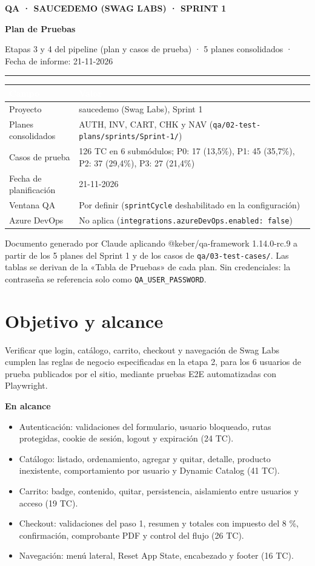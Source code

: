 \documentclass[10pt,a4paper]{article}
\newcommand{\tabhead}{\rowcolor{primary}}
\newcommand{\hcell}[1]{\textcolor{white}{\bfseries #1}}
\newcommand{\zebrarows}{\rowcolors{2}{zebra}{white}}
\newcommand{\reportcover}[3]{%
  \thispagestyle{first}%
  {\color{primary}\small\bfseries #1}\par\vspace{4pt}
  {\raggedright\fontsize{22}{28}\selectfont\bfseries\color{ink} #2\par}\vspace{6pt}
  {\small\color{muted} #3}\par\vspace{6pt}
  {\color{primary}\rule{\textwidth}{1pt}}\par
}
\begin{document}
\small

\reportcover
  {QA · SAUCEDEMO (SWAG LABS) · SPRINT 1}
  {Plan de Pruebas}
  {Etapas 3 y 4 del pipeline (plan y casos de prueba) · 5 planes consolidados · Fecha de informe: 21-11-2026}

{\zebrarows
\begin{tabularx}{\textwidth}{|L{0.24\textwidth}|Y|}
\hline
\tabhead \hcell{Campo} & \hcell{Valor} \\ \hline
Proyecto & saucedemo (Swag Labs), Sprint 1 \\ \hline
Planes consolidados & AUTH, INV, CART, CHK y NAV (\texttt{qa/02-test-plans/sprints/Sprint-1/}) \\ \hline
Casos de prueba & 126 TC en 6 submódulos; P0: 17 (13,5\%), P1: 45 (35,7\%), P2: 37 (29,4\%), P3: 27 (21,4\%) \\ \hline
Fecha de planificación & 21-11-2026 \\ \hline
Ventana QA & Por definir (\texttt{sprintCycle} deshabilitado en la configuración) \\ \hline
Azure DevOps & No aplica (\texttt{integrations.azureDevOps.enabled: false}) \\ \hline
\end{tabularx}}

\begin{infonote}
Documento generado por Claude aplicando @keber/qa-framework 1.14.0-rc.9 a partir de los 5 planes del Sprint 1 y de los casos de \texttt{qa/03-test-cases/}. Las tablas se derivan de la «Tabla de Pruebas» de cada plan. Sin credenciales: la contraseña se referencia solo como \texttt{QA\_USER\_PASSWORD}.
\end{infonote}

\section{Objetivo y alcance}
Verificar que login, catálogo, carrito, checkout y navegación de Swag Labs cumplen las reglas de negocio especificadas en la etapa 2, para los 6 usuarios de prueba publicados por el sitio, mediante pruebas E2E automatizadas con Playwright.

\textbf{En alcance}
\begin{itemize}
  \item Autenticación: validaciones del formulario, usuario bloqueado, rutas protegidas, cookie de sesión, logout y expiración (24 TC).
  \item Catálogo: listado, ordenamiento, agregar y quitar, detalle, producto inexistente, comportamiento por usuario y Dynamic Catalog (41 TC).
  \item Carrito: badge, contenido, quitar, persistencia, aislamiento entre usuarios y acceso (19 TC).
  \item Checkout: validaciones del paso 1, resumen y totales con impuesto del 8 \%, confirmación, comprobante PDF y control del flujo (26 TC).
  \item Navegación: menú lateral, Reset App State, encabezado y footer (16 TC).
\end{itemize}
\end{document}
